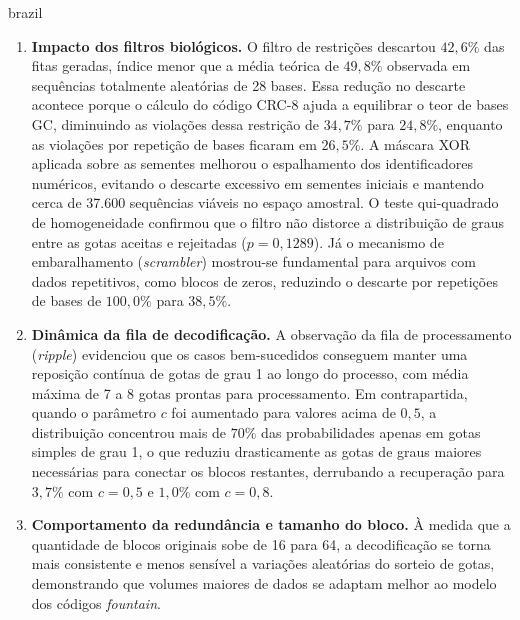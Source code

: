 \begin{resumo}
\begin{otherlanguage*}{brazil}
\begin{enumerate}
    \item \textbf{Impacto dos filtros biológicos.} O filtro de restrições descartou $42{,}6\%$ das fitas geradas, índice menor que a média teórica de $49{,}8\%$ observada em sequências totalmente aleatórias de 28 bases. Essa redução no descarte acontece porque o cálculo do código CRC-8 ajuda a equilibrar o teor de bases GC, diminuindo as violações dessa restrição de $34{,}7\%$ para $24{,}8\%$, enquanto as violações por repetição de bases ficaram em $26{,}5\%$. A máscara XOR aplicada sobre as sementes melhorou o espalhamento dos identificadores numéricos, evitando o descarte excessivo em sementes iniciais e mantendo cerca de 37.600 sequências viáveis no espaço amostral. O teste qui-quadrado de homogeneidade confirmou que o filtro não distorce a distribuição de graus entre as gotas aceitas e rejeitadas ($p = 0{,}1289$). Já o mecanismo de embaralhamento (\emph{scrambler}) mostrou-se fundamental para arquivos com dados repetitivos, como blocos de zeros, reduzindo o descarte por repetições de bases de $100{,}0\%$ para $38{,}5\%$.
    
    \item \textbf{Dinâmica da fila de decodificação.} A observação da fila de processamento (\emph{ripple}) evidenciou que os casos bem-sucedidos conseguem manter uma reposição contínua de gotas de grau 1 ao longo do processo, com média máxima de 7 a 8 gotas prontas para processamento. Em contrapartida, quando o parâmetro $c$ foi aumentado para valores acima de $0{,}5$, a distribuição concentrou mais de $70\%$ das probabilidades apenas em gotas simples de grau 1, o que reduziu drasticamente as gotas de graus maiores necessárias para conectar os blocos restantes, derrubando a recuperação para $3{,}7\%$ com $c = 0{,}5$ e $1{,}0\%$ com $c = 0{,}8$.
    
    \item \textbf{Comportamento da redundância e tamanho do bloco.} À medida que a quantidade de blocos originais sobe de 16 para 64, a decodificação se torna mais consistente e menos sensível a variações aleatórias do sorteio de gotas, demonstrando que volumes maiores de dados se adaptam melhor ao modelo dos códigos \emph{fountain}.
    

\end{enumerate}
\end{otherlanguage*}
\end{resumo}
